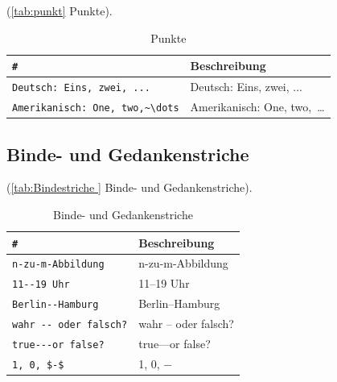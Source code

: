 (\autoref{tab:punkt} Punkte).
\begin{table}[!hb] %
	\centering
	\begin{tabular} {ll}
	\toprule %
	\verb|#| & \textbf{Beschreibung} \\
	\midrule
	\verb|Deutsch: Eins, zwei, ...| & Deutsch: Eins, zwei, ... \\
	\verb|Amerikanisch: One, two,~\dots| & Amerikanisch: One, two,~\dots \\
	\bottomrule
	\end{tabular}
	\caption{Punkte }	%
	\label{tab:punkt}	%
\end{table}

\subsection{Binde- und Gedankenstriche}\label{sec:Binde-Gedankenstriche}

(\autoref{tab:Bindestriche } Binde- und Gedankenstriche).
\begin{table}[!hb]%
	\centering
	\begin{tabular} {ll}
	\toprule %
	\verb|#| & \textbf{Beschreibung} \\
	\midrule
	\verb|n-zu-m-Abbildung| & n-zu-m-Abbildung \\
	\verb|11--19 Uhr| & 11--19 Uhr \\
	\verb|Berlin--Hamburg| & Berlin--Hamburg \\
	\verb|wahr -- oder falsch?| & wahr -- oder falsch? \\
	\verb|true---or false?| & true---or false? \\
	\verb|1, 0, $-$| & 1, 0, $-$ \\
	\bottomrule
	\end{tabular}
	\caption{Binde- und Gedankenstriche }	%
	\label{tab:Bindestriche }	%
\end{table}

